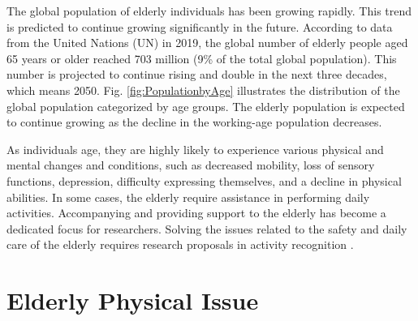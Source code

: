 The global population of elderly individuals has been growing rapidly. This trend is predicted to continue growing significantly in the future. According to data from the United Nations (UN) in 2019, the global number of elderly people aged 65 years or older reached 703 million (9\% of the total global population). This number is projected to continue rising and double in the next three decades, which means 2050. Fig. \ref{fig:PopulationbyAge} illustrates the distribution of the global population categorized by age groups. The elderly population is expected to continue growing as the decline in the working-age population decreases.


As individuals age, they are highly likely to experience various physical and mental changes and conditions, such as decreased mobility, loss of sensory functions, depression, difficulty expressing themselves, and a decline in physical abilities. In some cases, the elderly require assistance in performing daily activities. Accompanying and providing support to the elderly has become a dedicated focus for researchers. Solving the issues related to the safety and daily care of the elderly requires research proposals in activity recognition \cite{elderly1}.


\section{Elderly Physical Issue}
\label{sec2:ElderlyPhysicalIssue}

